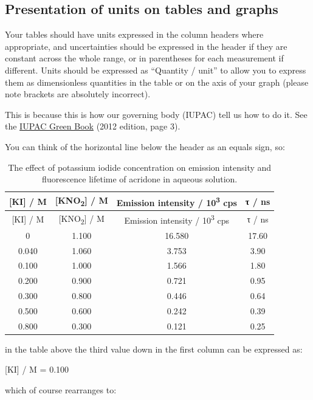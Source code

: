 \documentclass[
]{book}
\begin{document}
\hypertarget{subsec:units}{%
\subsection{Presentation of units on tables and graphs}\label{subsec:units}}

Your tables should have units expressed in the column headers where appropriate, and uncertainties should be expressed in the header if they are constant across the whole range, or in parentheses for each measurement if different. Units should be expressed as ``Quantity / unit'' to allow you to express them as dimensionless quantities in the table or on the axis of your graph (please note brackets are absolutely incorrect).

This is because this is how our governing body (IUPAC) tell us how to do it. See the \href{https://iupac.org/wp-content/uploads/2019/05/IUPAC-GB3-2012-2ndPrinting-PDFsearchable.pdf}{IUPAC Green Book} (2012 edition, page 3).

You can think of the horizontal line below the header as an equals sign, so:

\begin{longtable}[]{@{}cccc@{}}
\caption{\label{tab:acridonequench} The effect of potassium iodide concentration on emission intensity and fluorescence lifetime of acridone in aqueous solution.}\tabularnewline
\toprule
{[}KI{]} / M & {[}KNO\textsubscript{2}{]} / M & Emission intensity / 10\textsuperscript{3} cps & τ / ns \\
\midrule
\endfirsthead
\toprule
{[}KI{]} / M & {[}KNO\textsubscript{2}{]} / M & Emission intensity / 10\textsuperscript{3} cps & τ / ns \\
\midrule
\endhead
0 & 1.100 & 16.580 & 17.60 \\
0.040 & 1.060 & 3.753 & 3.90 \\
0.100 & 1.000 & 1.566 & 1.80 \\
0.200 & 0.900 & 0.721 & 0.95 \\
0.300 & 0.800 & 0.446 & 0.64 \\
0.500 & 0.600 & 0.242 & 0.39 \\
0.800 & 0.300 & 0.121 & 0.25 \\
\bottomrule
\end{longtable}

in the table above the third value down in the first column can be expressed as:

{[}KI{]} / M = 0.100

which of course rearranges to:
\end{document}
